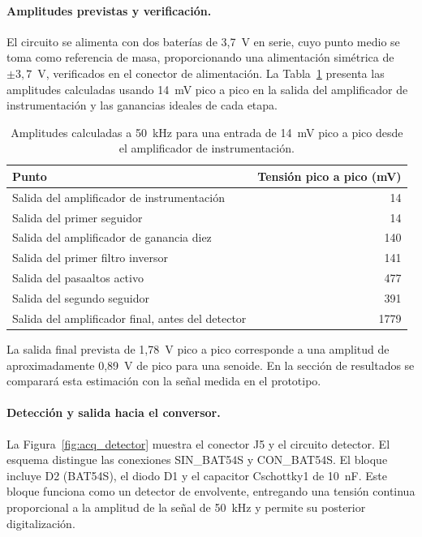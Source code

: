 \documentclass[12pt,a4paper]{article}
\begin{document}
\paragraph{Amplitudes previstas y verificación.}
El circuito se alimenta con dos baterías de 3,7~V en serie, cuyo punto medio se toma como referencia de masa,
proporcionando una alimentación simétrica de $\pm3{,}7$~V, verificados en el conector de alimentación.
La Tabla~\ref{tab:amplitudes_propuestas} presenta las amplitudes calculadas usando 14~mV pico a pico
en la salida del amplificador de instrumentación y las ganancias ideales de cada etapa.
\begin{table}[htbp]
    \centering
    \caption{Amplitudes calculadas a 50~kHz para una entrada de 14~mV pico a pico desde el amplificador de instrumentación.}
    \label{tab:amplitudes_propuestas}
    \begin{tabular}{lr}
        \hline
        Punto & Tensión pico a pico (mV) \\
        \hline
        Salida del amplificador de instrumentación & 14 \\
        Salida del primer seguidor & 14 \\
        Salida del amplificador de ganancia diez & 140 \\
        Salida del primer filtro inversor & 141 \\
        Salida del pasaaltos activo & 477 \\
        Salida del segundo seguidor & 391 \\
        Salida del amplificador final, antes del detector & 1779 \\
        \hline
    \end{tabular}
\end{table}
La salida final prevista de 1,78~V pico a pico corresponde a una amplitud de aproximadamente
0,89~V de pico para una senoide. En la sección de resultados se comparará esta estimación con la señal medida en el prototipo.

\paragraph{Detección y salida hacia el conversor.}
La Figura~\ref{fig:acq_detector} muestra el conector J5 y el circuito detector.
El esquema distingue las conexiones SIN\_BAT54S y CON\_BAT54S. El bloque incluye
D2 (BAT54S), el diodo D1 y el capacitor Cschottky1 de 10~nF.
Este bloque funciona como un detector de envolvente, entregando una tensión continua proporcional a la amplitud de la señal de 50~kHz
y permite su posterior digitalización. 
\end{document}
